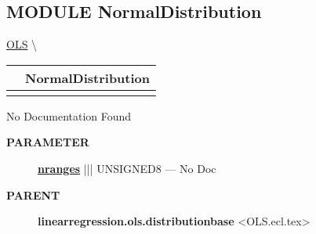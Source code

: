 \subsection*{\textsf{\colorbox{headtoc}{\color{white} MODULE}
NormalDistribution}}

\hypertarget{ecldoc:linearregression.ols.normaldistribution}{}
\hspace{0pt} \hyperlink{ecldoc:linearregression.ols}{OLS} \textbackslash 

{\renewcommand{\arraystretch}{1.5}
\begin{tabularx}{\textwidth}{|>{\raggedright\arraybackslash}l|X|}
\hline
\hspace{0pt}\mytexttt{\color{red} } & \textbf{NormalDistribution} \\
\hline
\multicolumn{2}{|>{\raggedright\arraybackslash}X|}{\hspace{0pt}\mytexttt{\color{param} (t\_Count NRanges)}} \\
\hline
\end{tabularx}
}

\par





No Documentation Found






\par
\begin{description}
\item [\colorbox{tagtype}{\color{white} \textbf{\textsf{PARAMETER}}}] \textbf{\underline{nranges}} ||| UNSIGNED8 --- No Doc
\end{description}









\par
\begin{description}
\item [\colorbox{tagtype}{\color{white} \textbf{\textsf{PARENT}}}] \textbf{linearregression.ols.distributionbase} <OLS.ecl.tex>
\end{description}


